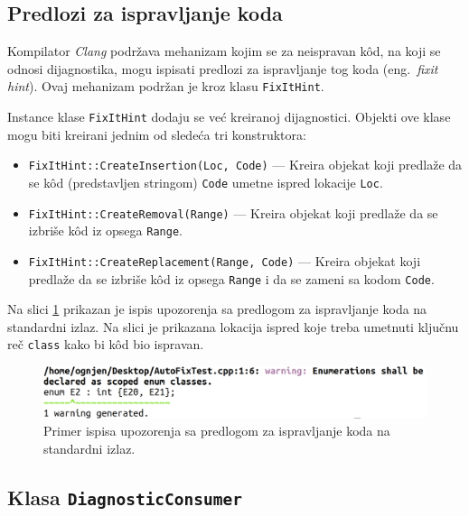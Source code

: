 \documentclass[12pt,oneside]{memoir}
\begin{document}
\subsection{Predlozi za ispravljanje koda}

Kompilator \textit{Clang} podr\v{z}ava mehanizam kojim se za neispravan k\^{o}d, na koji se odnosi dijagnostika, mogu ispisati predlozi za ispravljanje tog koda (eng.~\textit{fixit hint}). Ovaj mehanizam podr\v{z}an je kroz klasu \texttt{FixItHint}.
\par
Instance klase \texttt{FixItHint} dodaju se ve\'{c} kreiranoj dijagnostici. Objekti ove
klase mogu biti kreirani jednim od slede\'{c}a tri konstruktora:

\begin{itemize}
\item \texttt{FixItHint::CreateInsertion(Loc, Code)} --- Kreira objekat koji predla\v{z}e da se k\^{o}d (predstavljen stringom) \texttt{Code} umetne ispred lokacije \texttt{Loc}.
\item \texttt{FixItHint::CreateRemoval(Range)} --- Kreira objekat koji predla\v{z}e da se izbri\v{s}e k\^{o}d iz opsega \texttt{Range}.
\item \texttt{FixItHint::CreateReplacement(Range, Code)} --- Kreira objekat koji predla\v{z}e da se izbri\v{s}e k\^{o}d iz opsega \texttt{Range} i da se zameni sa kodom \texttt{Code}.
\end{itemize}

Na slici \ref{fig:fixit} prikazan je ispis upozorenja sa predlogom za ispravljanje koda na standardni izlaz. Na slici je prikazana lokacija
ispred koje treba umetnuti klju\v{c}nu re\v{c} \texttt{class} kako bi k\^{o}d bio ispravan.

\begin{figure}[!h]
\begin{center}
\includegraphics[scale=0.225]{fixit.png}
\end{center}
\caption{Primer ispisa upozorenja sa predlogom za ispravljanje koda na standardni izlaz.}
\label{fig:fixit}
\end{figure}

\subsection{Klasa \texttt{DiagnosticConsumer}}
\end{document}
